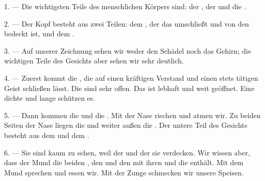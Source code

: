 %

\VUsaut{4.0mm}
\VUsaut{2.0mm}

\VUsaut{2.4mm}
\VUsaut{3.0mm}

1. --- Die wichtigsten Teile des menschlichen Körpers sind: der , der
 und die .

\VUsaut{3.0mm}

2. --- Der Kopf besteht aus zwei Teilen: dem , der das
 umschließt und von den  bedeckt ist, und dem
.

3. --- Auf unserer Zeichnung sehen wir weder den Schädel noch das Gehirn; die
wichtigen Teile des Gesichts aber sehen wir sehr deutlich.

4. --- Zuerst kommt die , die auf einen kräftigen Verstand und
einen stets tätigen Geist schließen lässt. Die  sind sehr offen.
Das  ist lebhaft und weit geöffnet. Eine dichte 
und lange  schützen es.

5. --- Dann kommen die  und die . Mit der Nase
riechen und atmen wir. Zu beiden Seiten der Nase liegen die  und
weiter außen die . Der untere Teil des Gesichts besteht aus dem
 und dem .

6. --- Sie sind kaum zu sehen, weil der  und der 
sie verdecken. Wir wissen aber, dass der Mund die beiden , den
 und den  mit ihren  und die
 enthält. Mit dem Mund sprechen und essen wir. Mit der Zunge
schmecken wir unsere Speisen.

